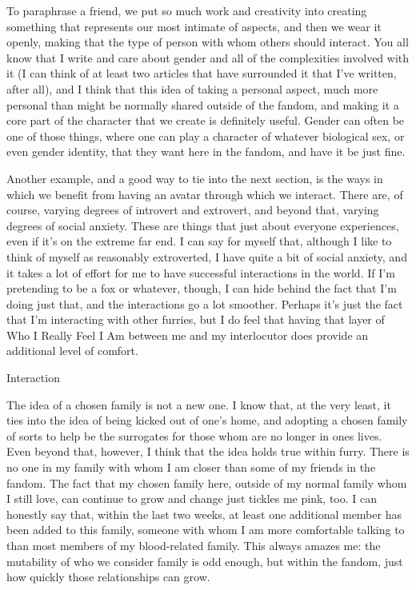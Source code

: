 To paraphrase a friend, we put so much work and creativity into creating something that represents our most intimate of aspects, and then we wear it openly, making that the type of person with whom others should interact. You all know that I write and care about gender and all of the complexities involved with it (I can think of at least two articles that have surrounded it that I've written, after all), and I think that this idea of taking a personal aspect, much more personal than might be normally shared outside of the fandom, and making it a core part of the character that we create is definitely useful. Gender can often be one of those things, where one can play a character of whatever biological sex, or even gender identity, that they want here in the fandom, and have it be just fine.

Another example, and a good way to tie into the next section, is the ways in which we benefit from having an avatar through which we interact. There are, of course, varying degrees of introvert and extrovert, and beyond that, varying degrees of social anxiety. These are things that just about everyone experiences, even if it's on the extreme far end. I can say for myself that, although I like to think of myself as reasonably extroverted, I have quite a bit of social anxiety, and it takes a lot of effort for me to have successful interactions in the world. If I'm pretending to be a fox or whatever, though, I can hide behind the fact that I'm doing just that, and the interactions go a lot smoother. Perhaps it's just the fact that I'm interacting with other furries, but I do feel that having that layer of Who I Really Feel I Am between me and my interlocutor does provide an additional level of comfort.

Interaction

The idea of a chosen family is not a new one. I know that, at the very least, it ties into the idea of being kicked out of one's home, and adopting a chosen family of sorts to help be the surrogates for those whom are no longer in ones lives. Even beyond that, however, I think that the idea holds true within furry. There is no one in my family with whom I am closer than some of my friends in the fandom. The fact that my chosen family here, outside of my normal family whom I still love, can continue to grow and change just tickles me pink, too. I can honestly say that, within the last two weeks, at least one additional member has been added to this family, someone with whom I am more comfortable talking to than most members of my blood-related family. This always amazes me: the mutability of who we consider family is odd enough, but within the fandom, just how quickly those relationships can grow.

